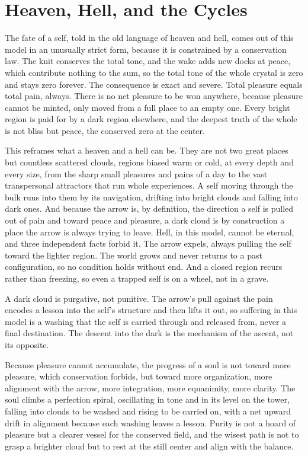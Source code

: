\section{Heaven, Hell, and the Cycles}

The fate of a self, told in the old language of heaven and hell, comes out of this model in an unusually strict form, because it is constrained by a conservation law. The knit conserves the total tone, and the wake adds new docks at peace, which contribute nothing to the sum, so the total tone of the whole crystal is zero and stays zero forever. The consequence is exact and severe. Total pleasure equals total pain, always. There is no net pleasure to be won anywhere, because pleasure cannot be minted, only moved from a full place to an empty one. Every bright region is paid for by a dark region elsewhere, and the deepest truth of the whole is not bliss but peace, the conserved zero at the center.

This reframes what a heaven and a hell can be. They are not two great places but countless scattered clouds, regions biased warm or cold, at every depth and every size, from the sharp small pleasures and pains of a day to the vast transpersonal attractors that run whole experiences. A self moving through the bulk runs into them by its navigation, drifting into bright clouds and falling into dark ones. And because the arrow is, by definition, the direction a self is pulled out of pain and toward peace and pleasure, a dark cloud is by construction a place the arrow is always trying to leave. Hell, in this model, cannot be eternal, and three independent facts forbid it. The arrow expels, always pulling the self toward the lighter region. The world grows and never returns to a past configuration, so no condition holds without end. And a closed region recurs rather than freezing, so even a trapped self is on a wheel, not in a grave.

\begin{principle}
A dark cloud is purgative, not punitive. The arrow's pull against the pain encodes a lesson into the self's structure and then lifts it out, so suffering in this model is a washing that the self is carried through and released from, never a final destination. The descent into the dark is the mechanism of the ascent, not its opposite.
\end{principle}

Because pleasure cannot accumulate, the progress of a soul is not toward more pleasure, which conservation forbids, but toward more organization, more alignment with the arrow, more integration, more equanimity, more clarity. The soul climbs a perfection spiral, oscillating in tone and in its level on the tower, falling into clouds to be washed and rising to be carried on, with a net upward drift in alignment because each washing leaves a lesson. Purity is not a hoard of pleasure but a clearer vessel for the conserved field, and the wisest path is not to grasp a brighter cloud but to rest at the still center and align with the balance.


